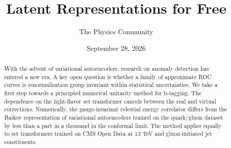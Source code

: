 \documentclass[11pt]{article}
\title{Latent Representations for Free}
\author{The Physics Community}
\date{September 28, 2026}
\numberwithin{equation}{section}
\theoremstyle{definition}
\theoremstyle{remark}
\begin{document}
\maketitle
\begin{abstract}
With the advent of variational autoencoders, research on anomaly
detection has entered a new era. A key open question is whether a family
of approximate ROC curves is renormalization group invariant within
statistical uncertainties. We take a first step towards a principled
numerical unitarity method for b-tagging. The dependence on the
light-flavor set transformer cancels between the real and virtual
corrections. Numerically, the gauge-invariant celestial energy
correlator differs from the Baikov representation of variational
autoencoders trained on the quark/gluon dataset by less than a part in a
thousand in the conformal limit. The method applies equally to set
transformers trained on CMS Open Data at 13 TeV and gluon-initiated jet
constituents.
\end{abstract}
\tableofcontents





\nocite{*}


\end{document}
